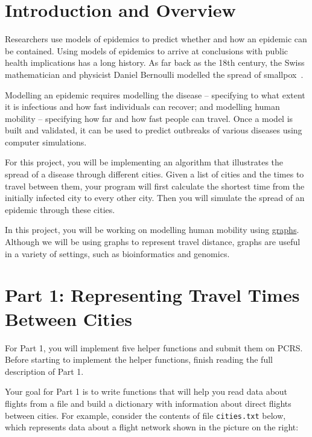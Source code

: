 \documentclass{assignment}
\begin{document}
\newcommand{\comment}[1]{{\color{blue} Comment: \color{blue}{#1}}}
\section*{Introduction and Overview}

Researchers use models of epidemics to predict whether and how an epidemic can be contained. Using models of epidemics to arrive at conclusions with public health implications has a long history. As far back as the 18th century, the Swiss mathematician and physicist Daniel Bernoulli modelled the spread of smallpox~\cite{Bernoulli}. 

Modelling an epidemic requires modelling the disease -- specifying to what extent it is infectious and how fast individuals can recover; and modelling human mobility -- specifying how far and how fast people can travel.  Once a model is built and validated, it can be used to predict outbreaks of various diseases using computer simulations.

For this project, you will be implementing an algorithm that illustrates the
spread of a disease through different cities. Given a list of cities 
and the times to travel between them, your program will first calculate the shortest time
from the initially infected city to every other city. Then you will simulate the spread of an epidemic through these cities.

In this project, you will be working on modelling human mobility using \href{https://en.wikipedia.org/wiki/Graph_(discrete_mathematics)}{graphs}. Although we will be using graphs to represent travel distance, graphs are useful in a variety of settings, such as bioinformatics and genomics. 

\vspace*{-0.5cm}
\section*{Part 1: Representing Travel Times Between Cities}

For Part 1, you will implement five helper functions and submit them on PCRS.  Before starting to implement the helper functions, finish reading the full description of Part 1. 

Your goal for Part 1 is to write functions that will help you read data about flights from a file and build a dictionary with information about direct flights between cities.  For example, consider the contents of file \verb|cities.txt| below, which represents data about a flight network shown in the picture on the right:
\end{document}
